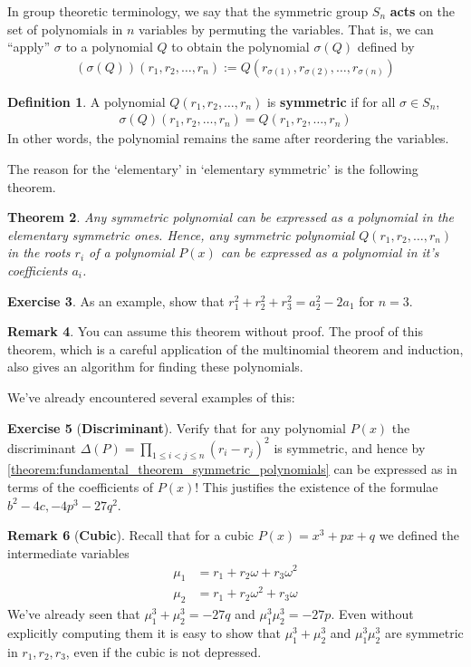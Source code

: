 \documentclass[reqno, 12pt, letter]{article}
\theoremstyle{plain}
\newtheorem{theorem}{Theorem}[section]
\theoremstyle{definition}
\newtheorem{definition}[theorem]{Definition}
\newtheorem{remark}[theorem]{Remark}
\newtheorem{exercise}[theorem]{Exercise}
\theoremstyle{remark}
\numberwithin{equation}{section}
\begin{document}
	In group theoretic terminology, we say that the symmetric group $ S_n$ \textbf{acts} on the set of polynomials in $ n$ variables by permuting the variables. 
	That is, we can ``apply'' $\sigma$ to a polynomial $Q$ to obtain the polynomial $\sigma(Q)$ defined by
		\begin{align*}
			(\sigma(Q))(r_1, r_2, \dots, r_n) := Q(r_{\sigma(1)}, r_{\sigma(2)}, \dots, r_{\sigma(n)})
		\end{align*}
		\begin{definition}
			\label{definition:}
			A polynomial $Q(r_1, r_2, \dots, r_n)$ is {\bf symmetric} if for all $\sigma \in S_n $, 
	\begin{align*}
		\sigma(Q) (r_1, r_2, \dots, r_n)= Q(r_1, r_2, \dots, r_n)
	\end{align*}
	In other words, the polynomial remains the same after reordering the variables.
		\end{definition}
	The reason for the `elementary' in `elementary symmetric' is the following theorem.
	\begin{theorem}
		\label{theorem:fundamental_theorem_symmetric_polynomials}
		Any symmetric polynomial can be expressed as a polynomial in the elementary symmetric ones. 
		Hence, any symmetric polynomial $ Q(r_1, r_2, \dots, r_n)$ in the roots $ r_i$ of a polynomial $ P(x)$ can be expressed as a polynomial in it's coefficients $ a_i$.
	\end{theorem}
	\begin{exercise}
		As an example, show that $ r_1^2 + r_2^2 + r_3^2  = a_2^2 - 2 a_1$ for $ n=3$.
	\end{exercise}
	\begin{remark}
		You can assume this theorem without proof. The proof of this theorem, which is a careful application of the multinomial theorem and induction, also gives an algorithm for finding these polynomials.
	\end{remark}
	
	We've already encountered several examples of this:
	\begin{exercise}[\textbf{Discriminant}]
		Verify that for any polynomial $ P(x)$ the discriminant $\Delta(P) = \prod_{1 \leq i < j \leq n} (r_i - r_j)^2$ is symmetric, and hence by \autoref{theorem:fundamental_theorem_symmetric_polynomials} can be expressed as in terms of the coefficients of $ P(x)$! This justifies the existence of the formulae $ b^2 - 4c, -4p^3 - 27q^2$.
	\end{exercise}
	
	\begin{remark}[\textbf{Cubic}] Recall that for a cubic $ P(x)=x^3 + px + q$ we defined the intermediate variables \begin{align*}
    \mu_1 &= r_1 + r_2 \omega + r_3 \omega^2 \\
    \mu_2 &= r_1 + r_2 \omega^2 + r_3 \omega
  \end{align*}
	We've already seen that $ \mu_1^3 + \mu_2^3 = -27q$ and $ \mu_1^3 \mu_2^3 = -27p$. Even without explicitly computing them it is easy to show that $ \mu_1^3 + \mu_2^3$ and $\mu_1^3  \mu_2^3$ are symmetric in $ r_1, r_2, r_3$, even if the cubic is not depressed.
	\end{remark}
	
\end{document}
